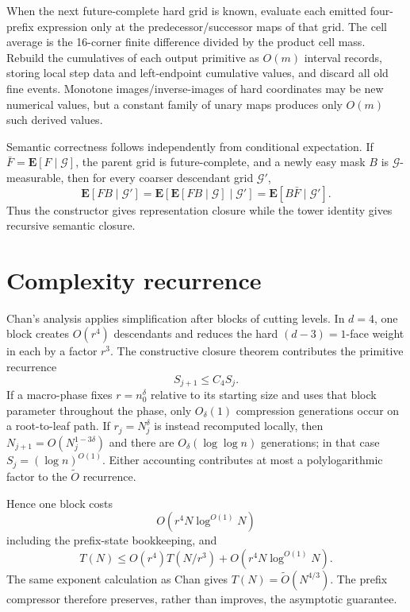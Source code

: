 \documentclass[12pt,a4paper]{article}
\theoremstyle{definition}
\newcommand{\E}{\mathbf E}
\newcommand{\1}{\mathbf 1}
\begin{document}
When the next future-complete hard grid is known, evaluate each emitted four-prefix expression only at the predecessor/successor maps of that grid.  The cell average is the 16-corner finite difference divided by the product cell mass.  Rebuild the cumulatives of each output primitive as $O(m)$ interval records, storing local step data and left-endpoint cumulative values, and discard all old fine events.  Monotone images/inverse-images of hard coordinates may be new numerical values, but a constant family of unary maps produces only $O(m)$ such derived values.

Semantic correctness follows independently from conditional expectation.  If $\bar F=\E[F\mid\mathcal G]$, the parent grid is future-complete, and a newly easy mask $B$ is $\mathcal G$-measurable, then for every coarser descendant grid $\mathcal G'$,
\[
\E[FB\mid\mathcal G']
=\E[\E[FB\mid\mathcal G]\mid\mathcal G']
=\E[B\bar F\mid\mathcal G'].
\]
Thus the constructor gives representation closure while the tower identity gives recursive semantic closure.

\section{Complexity recurrence}                                   \label{app:recurrence}

Chan's analysis applies simplification after blocks of cutting levels.  In $d=4$, one block creates $O(r^4)$ descendants and reduces the hard $(d-3)=1$-face weight in each by a factor $r^3$.  The constructive closure theorem contributes the primitive recurrence
\[
S_{j+1}\le C_4S_j.
\]
If a macro-phase fixes $r=n_0^{\delta}$ relative to its starting size and uses that block parameter throughout the phase, only $O_{\delta}(1)$ compression generations occur on a root-to-leaf path.  If $r_j=N_j^{\delta}$ is instead recomputed locally, then $N_{j+1}=O(N_j^{1-3\delta})$ and there are $O_{\delta}(\log\log n)$ generations; in that case $S_j=(\log n)^{O(1)}$.  Either accounting contributes at most a polylogarithmic factor to the $\widetilde O$ recurrence.

Hence one block costs
\[
O(r^4N\log^{O(1)}N)
\]
including the prefix-state bookkeeping, and
\[
T(N)\le O(r^4)T(N/r^3)+O(r^4N\log^{O(1)}N).
\]
The same exponent calculation as Chan gives $T(N)=\widetilde O(N^{4/3})$.  The prefix compressor therefore preserves, rather than improves, the asymptotic guarantee.
\end{document}
